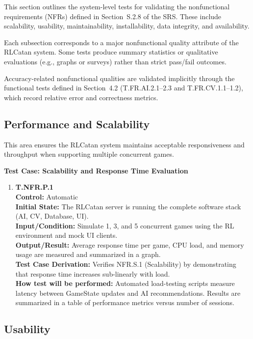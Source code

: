 \documentclass[12pt, titlepage]{article}
\begin{document}
This section outlines the system-level tests for validating the nonfunctional requirements (NFRs) defined in Section~S.2.8 of the SRS. These include scalability, usability, maintainability, installability, data integrity, and availability. 

Each subsection corresponds to a major nonfunctional quality attribute of the RLCatan system. Some tests produce summary statistics or qualitative evaluations (e.g., graphs or surveys) rather than strict pass/fail outcomes.  

Accuracy-related nonfunctional qualities are validated implicitly through the functional tests defined in Section~4.2 (T.FR.AI.2.1--2.3 and T.FR.CV.1.1--1.2), which record relative error and correctness metrics.

\subsection{Performance and Scalability}

This area ensures the RLCatan system maintains acceptable responsiveness and throughput when supporting multiple concurrent games.

\textbf{Test Case: Scalability and Response Time Evaluation}

\begin{enumerate}
\item \textbf{T.NFR.P.1} \\
\textbf{Control:} Automatic \\
\textbf{Initial State:} The RLCatan server is running the complete software stack (AI, CV, Database, UI). \\
\textbf{Input/Condition:} Simulate 1, 3, and 5 concurrent games using the RL environment and mock UI clients. \\
\textbf{Output/Result:} Average response time per game, CPU load, and memory usage are measured and summarized in a graph. \\
\textbf{Test Case Derivation:} Verifies NFR.S.1 (Scalability) by demonstrating that response time increases sub-linearly with load. \\
\textbf{How test will be performed:} Automated load-testing scripts measure latency between GameState updates and AI recommendations. Results are summarized in a table of performance metrics versus number of sessions.
\end{enumerate}

\subsection{Usability}
\end{document}
